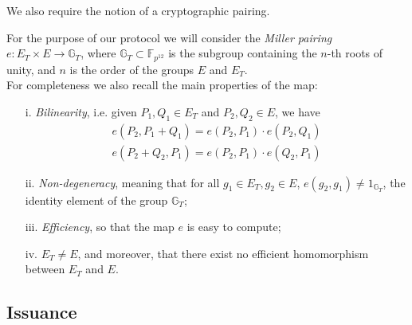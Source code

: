 We also require the notion of a cryptographic pairing. \cite{weilpair}

For the purpose of our protocol we will consider the \emph{Miller
pairing} $e: E_T \times E\to \mathbb{G}_T$, where $\mathbb{G}_T\subset
\mathbb{F}_{p^{12}}$ is the subgroup containing the $n$-th roots of
unity, and $n$ is the order of the groups $E$ and $E_T$.\\ For
completeness we also recall the main properties of the map:

\begin{itemize}

\item [i.] \emph{Bilinearity}, i.e. given $P_1,Q_1\in E_T$
  and $P_2,Q_2\in E$, we have
  \begin{align*}
    e(P_2,P_1+Q_1) = e(P_2,P_1)\cdot e(P_2,Q_1)   \\
    e(P_2+Q_2,P_1) = e(P_2,P_1)\cdot e(Q_2,P_1)
  \end{align*}

\item[ii.] \emph{Non-degeneracy}, meaning that for all
  $g_1\in E_T, g_2\in E$, $e(g_2,g_1)\ne
  1_{\mathbb{G}_T}$, the identity element of the group
  $\mathbb{G}_T$;

\item[iii.] \emph{ Efficiency}, so that the map $e$ is easy to
  compute;

\item[iv. ] $E_T \ne E$, and moreover, that
  there exist no efficient homomorphism between $E_T$ and
  $E$.

\end{itemize}



\subsection{Issuance} \label{issuance}

